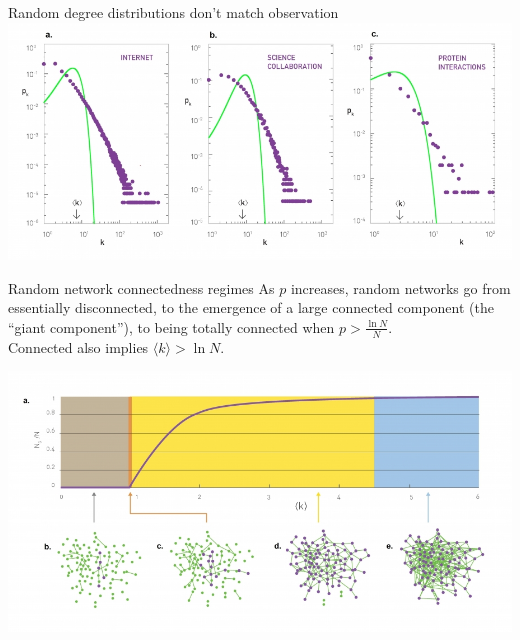\documentclass{beamer}
\begin{document}
\begin{frame}{Random degree distributions don't match observation}
  \includegraphics[width=1.1\textwidth]{Figures/poissonVsRealDegDist.jpg}
\end{frame}

\begin{frame}{Random network connectedness regimes}
  As $p$ increases, random networks go from essentially disconnected, to the
  emergence of a large connected component (the ``giant component''), to
  being totally connected when $p > \frac{\ln N}{N}$. \\[.25em]

  Connected also implies $\langle k \rangle > \ln N$. 

  \includegraphics[width=\textwidth]{Figures/randomRegimes.jpg}
\end{frame}
\end{document}
